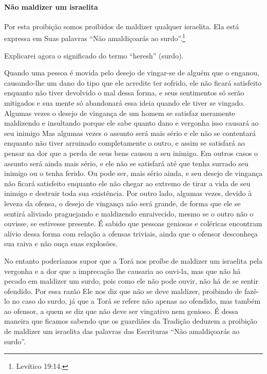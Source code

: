 \paragraph{Não maldizer um israelita}

Por esta proibição somos proibidos de maldizer qualquer israelita. Ela
está expressa em Suas palavras ``Não amaldiçoarás ao surdo''.\footnote{Levítico
19:14.}

Explicarei agora o significado do termo ``heresh'' (surdo).

Quando uma pessoa é movida pelo desejo de vingar-se de alguém que o
enganou, causando-lhe um dano do tipo que ele acredite ter sofrido, ele
não ficará satisfeito enquanto não tiver devolvido o mal dessa forma, e
seus sentimentos só serão mitigados e sua mente só abandonará essa ideia
quando ele tiver se vingado. Algumas vezes o desejo de vingança de um
homem se satisfaz meramente maldizendo e insultando porque ele sabe
quanto dano e vergonha isso causará ao seu inimigo Mas algumas vezes o assunto será mais
sério e ele não se contentará enquanto não tiver arruinado completamente
o outro, e assim se satisfará ao pensar na dor que a perda de seus bens
causou a seu inimigo. Em outros casos o assunto será ainda mais sério, e
ele não se satisfará até que tenha surrado seu inimigo ou o tenha
ferido. Ou pode ser, mais sério ainda, e seu desejo de
vingança não ficará satisfeito enquanto ele não chegar ao extremo de
tirar a vida de seu inimigo e destruir toda sua existência. Por outro
lado, algumas vezes, devido à leveza da ofensa, o desejo de vingança não
será grande, de forma que ele se sentirá aliviado praguejando e
maldizendo enraivecido, mesmo se o outro não o ouvisse, se estivesse
presente. É sabido que pessoas geniosas e coléricas encontram alívio
dessa forma com relação a ofensas triviais, ainda que o ofensor
desconheça sua raiva e não ouça suas explosões.

No entanto poderíamos supor que a Torá nos proíbe de maldizer um
israelita pela vergonha e a dor que a imprecação lhe causaria ao
ouvi-la, mas que não há pecado em maldizer um surdo, pois como ele não
pode ouvir, não há de se sentir ofendido. Por essa razão Ele nos diz que
não se deve maldizer, proibindo de fazê-lo no caso do surdo, já que a
Torá se refere não apenas ao ofendido, mas também ao ofensor, a quem se
diz que não deve ser vingativo nem genioso. É dessa maneira que ficamos
sabendo que os guardiães da Tradição deduzem a proibição de maldizer um
israelita das palavras das Escrituras ``Não amaldiçoarás ao surdo''.

